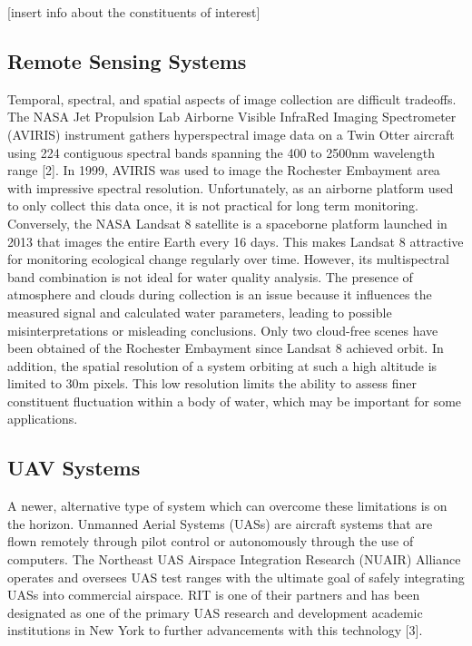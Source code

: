 \documentclass[12pt, letterpaper, oneside, onecolumn]{article}
\begin{document}
[insert info about the constituents of interest]

\subsection{Remote Sensing Systems}

Temporal, spectral, and spatial aspects of image collection are difficult tradeoffs. The NASA Jet Propulsion Lab Airborne Visible InfraRed Imaging Spectrometer (AVIRIS) instrument gathers hyperspectral image data on a Twin Otter aircraft using 224 contiguous spectral bands spanning the 400 to 2500nm wavelength range [2]. In 1999, AVIRIS was used to image the Rochester Embayment area with impressive spectral resolution. Unfortunately, as an airborne platform used to only collect this data once, it is not practical for long term monitoring. Conversely, the NASA Landsat 8 satellite is a spaceborne platform launched in 2013 that images the entire Earth every 16 days. This makes Landsat 8 attractive for monitoring ecological change regularly over time. However, its multispectral band combination is not ideal for water quality analysis. The presence of atmosphere and clouds during collection is an issue because it influences the measured signal and calculated water parameters, leading to possible misinterpretations or misleading conclusions. Only two cloud-free scenes have been obtained of the Rochester Embayment since Landsat 8 achieved orbit. In addition, the spatial resolution of a system orbiting at such a high altitude is limited to 30m pixels. This low resolution limits the ability to assess finer constituent fluctuation within a body of water, which may be important for some applications. 

\subsection{UAV Systems}
A newer, alternative type of system which can overcome these limitations is on the horizon. Unmanned Aerial Systems (UASs) are aircraft systems that are flown remotely through pilot control or autonomously through the use of computers. The Northeast UAS Airspace Integration Research (NUAIR) Alliance operates and oversees UAS test ranges with the ultimate goal of safely integrating UASs into commercial airspace. RIT is one of their partners and has been designated as one of the primary UAS research and development academic institutions in New York to further advancements with this technology [3].  
\end{document}
